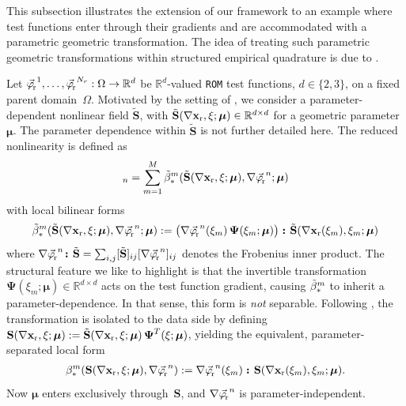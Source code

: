 \documentclass[onefignum,onetabnum]{siamart251104}
\newcommand{\bv}[1]{{\mathbf #1}}
\newcommand{\bt}[1]{{\mathbf{#1}}}
\newcommand{\rom}[1]{{{#1}_{\rm{r}}}}
\newcommand{\Nr}{{N_r}}
\newcommand{\R}{\mathbb{R}}
\newcommand{\ffun}{{\bv{f}}}
\newcommand{\xp}{{\xi}} %
\newcommand{\acro}[1]{{\texttt{#1}}}  %
\newcommand{\xrfVec}{{\nabla \rom{\bv{x}}}}       %
\newcommand{\phiVec}{{\rom{\vec{\varphi}\mkern-2mu}}} %
\newcommand{\nlField}{{\bt{S}}}                    %
\newcommand{\geoTrans}{{\boldsymbol{\Psi}}}        %
\begin{document}
This subsection illustrates the extension of our framework to an example where test functions enter through their gradients and are accommodated with a parametric geometric transformation. The idea of treating such parametric geometric transformations within structured empirical quadrature is due to \cite{art:Guo2024,art:Guo2024-secOrd}.

Let $\phiVec^1,\ldots,\phiVec^{\Nr}: \Omega \to \R^d$ be $\R^d$-valued \acro{ROM} test functions, $d \in \{2,3\}$, on a fixed parent domain~$\Omega$.  Motivated by the setting of \cite{art:Guo2024}, we consider a parameter-dependent nonlinear field $\tilde{\nlField}$, with $\tilde{\nlField}(\xrfVec,\xi ;\boldsymbol{\mu}) \in \R^{d\times d}$ for a geometric parameter $\boldsymbol{\mu}$. The parameter dependence within $\tilde{\nlField}$ is not further detailed here. The reduced nonlinearity is defined as
\begin{align*}
[\rom{\ffun}(\xrfVec,\xi;\boldsymbol{\mu})]_n = \sum_{m=1}^M \tilde{\beta}_{\rm{*}}^m(\tilde{\nlField}(\xrfVec,\xi;\boldsymbol{\mu}),\nabla  \phiVec^n; \boldsymbol{\mu})
\end{align*}
with local bilinear forms
\begin{align*}
\tilde{\beta}_{\rm{*}}^m(\tilde{\nlField}(\xrfVec,\xi;\boldsymbol{\mu}),\nabla \phiVec^n;\boldsymbol{\mu})
:= \bigl(\nabla\phiVec^n(\xp_m)\,\geoTrans(\xp_m;\boldsymbol{\mu})\bigr)
\,\boldsymbol{\colon} \tilde{\nlField}(\xrfVec(\xp_m),\xp_m;\boldsymbol{\mu})
\end{align*}
where $\nabla\phiVec^n  \boldsymbol{\colon} \tilde{\nlField}= \sum_{i,j}[\tilde{\nlField}]_{ij}[\nabla\phiVec^n]_{ij}$ denotes the Frobenius inner product. The structural feature we like to highlight is that the invertible transformation $\geoTrans(\xp_m;\boldsymbol{\mu})\in\R^{d\times d}$ acts on the test function gradient, causing $\tilde{\beta}_{\rm{*}}^m$ to inherit a parameter-dependence. In that sense, this form is \emph{not} separable.
Following \cite{art:Guo2024}, the transformation is isolated to the data side by defining
$\nlField(\xrfVec,\xi;\boldsymbol{\mu}) := \tilde{\nlField}(\xrfVec,\xi;\boldsymbol{\mu})\,\geoTrans^T(\xi;\boldsymbol{\mu})$,
yielding the equivalent, parameter-separated local form
\begin{align*}
\beta_{\rm{*}}^m(\nlField(\xrfVec,\xi;\boldsymbol{\mu}),\nabla \phiVec^n)
:= \nabla\phiVec^n(\xp_m) \,\boldsymbol{\colon} \nlField(\xrfVec(\xp_m),\xp_m;\boldsymbol{\mu}).
\end{align*}
Now $\boldsymbol{\mu}$ enters exclusively through~$\nlField$, and $\nabla\phiVec^n$ is parameter-independent.
\end{document}
